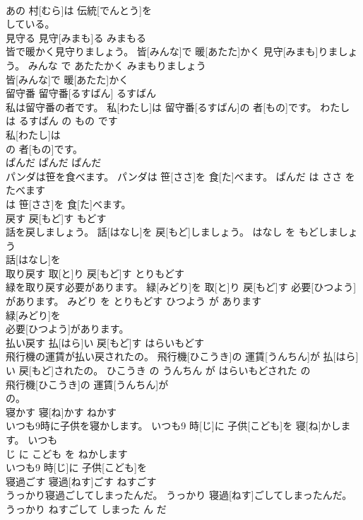 \documentclass[8pt]{extreport}
\begin{document}
\begin{CJK}{UTF8}{min}
\\	あの 村[むら]は 伝統[でんとう]を
\\	している。			
\\	見守る	見守[みまも]る	みまもる	
\\	皆で暖かく見守りましょう。	皆[みんな]で 暖[あたた]かく 見守[みまも]りましょう。	みんな で あたたかく みまもりましょう	
\\	皆[みんな]で 暖[あたた]かく
\\	留守番	留守番[るすばん]	るすばん	
\\	私は留守番の者です。	私[わたし]は 留守番[るすばん]の 者[もの]です。	わたし は るすばん の もの です	
\\	私[わたし]は
\\	の 者[もの]です。			
\\	ぱんだ	ぱんだ	ぱんだ	
\\	パンダは笹を食べます。	パンダは 笹[ささ]を 食[た]べます。	ぱんだ は ささ を たべます	
\\	は 笹[ささ]を 食[た]べます。			
\\	戻す	戻[もど]す	もどす	
\\	話を戻しましょう。	話[はなし]を 戻[もど]しましょう。	はなし を もどしましょう	
\\	話[はなし]を
\\	取り戻す	取[と]り 戻[もど]す	とりもどす	
\\	緑を取り戻す必要があります。	緑[みどり]を 取[と]り 戻[もど]す 必要[ひつよう]があります。	みどり を とりもどす ひつよう が あります	
\\	緑[みどり]を
\\	必要[ひつよう]があります。			
\\	払い戻す	払[はら]い 戻[もど]す	はらいもどす	
\\	飛行機の運賃が払い戻されたの。	飛行機[ひこうき]の 運賃[うんちん]が 払[はら]い 戻[もど]されたの。	ひこうき の うんちん が はらいもどされた の	
\\	飛行機[ひこうき]の 運賃[うんちん]が
\\	の。			
\\	寝かす	寝[ね]かす	ねかす	
\\	いつも9時に子供を寝かします。	いつも9 時[じ]に 子供[こども]を 寝[ね]かします。	いつも 
\\	じ に こども を ねかします	
\\	いつも9 時[じ]に 子供[こども]を
\\	寝過ごす	寝過[ねす]ごす	ねすごす	
\\	うっかり寝過ごしてしまったんだ。	うっかり 寝過[ねす]ごしてしまったんだ。	うっかり ねすごして しまった ん だ	

\end{CJK}
\end{document}
